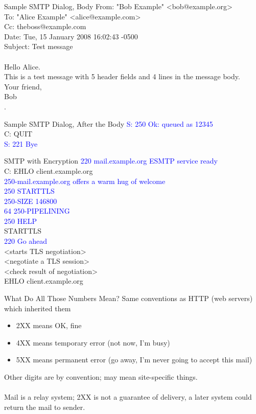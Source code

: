 \documentclass[nobackground,dvipsnames,table,aspectratio=169]{beamer}
\begin{document}
\begin{frame}{Sample SMTP Dialog, Body}
    From: "Bob Example" <bob@example.org>\\
    To: "Alice Example" <alice@example.com>\\
    Cc: theboss@example.com\\
    Date: Tue, 15 January 2008 16:02:43 -0500\\
    Subject: Test message\\~\\
    
    Hello Alice.\\
    This is a test message with 5 header fields and 4 lines in the message body.\\
    Your friend,\\
    Bob\\
    .
\end{frame}

\begin{frame}{Sample SMTP Dialog, After the Body}
    \textcolor{blue}{S: 250 Ok: queued as 12345}\\
    C: QUIT\\
    \textcolor{blue}{S: 221 Bye}
\end{frame}

\begin{frame}{SMTP with Encryption}
    \textcolor{blue}{220 mail.example.org ESMTP service ready}\\
       C: EHLO client.example.org\\
    \textcolor{blue}{250-mail.example.org offers a warm hug of welcome\\
    250 STARTTLS\\
    250-SIZE 146800\\64
    250-PIPELINING\\
    250 HELP}\\
    STARTTLS\\
    \textcolor{blue}{220 Go ahead}\\
    <starts TLS negotiation>\\
    <negotiate a TLS session>\\
    <check result of negotiation>\\
    EHLO client.example.org
\end{frame}

\begin{frame}{What Do All Those Numbers Mean?}
    Same conventions as HTTP (web servers) which inherited them
    \begin{itemize}
        \item 2XX means OK, fine
        \item 4XX means temporary error (not now, I’m busy)
        \item 5XX means permanent error (go away, I’m never going to accept this mail)
    \end{itemize}
    Other digits are by convention; may mean site-specific things.\\~\\
    Mail is a relay system; 2XX is not a guarantee of delivery, a later system could return the mail to sender.
\end{frame}
\end{document}
